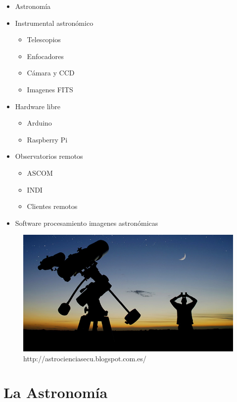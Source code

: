 \begin{itemize}
  \item {Astronomía}
  \item {Instrumental astronómico}
  \begin{itemize}
    \item{Telescopios}
    \item{Enfocadores}
    \item{Cámara y CCD}
    \item{Imagenes FITS}
  \end{itemize}
  \item {Hardware libre}
   \begin{itemize}
     \item{Arduino}
     \item{Raspberry Pi}
   \end{itemize}
  \item {Observatorios remotos}
   \begin{itemize}
     \item{ASCOM}
     \item{INDI}
     \item{Clientes remotos}
  \end{itemize}
  \item {Software procesamiento imagenes astronómicas}

\end{itemize}



\begin{figure}[b]
\centering
\includegraphics[width=0.7\linewidth]{../images/observatorio_amateur}
\caption[Observatorio Amateur]{http://astrocienciasecu.blogspot.com.es/}
\label{fig:observatorio_amateur}
\end{figure}


\newpage
\section{La Astronomía}

